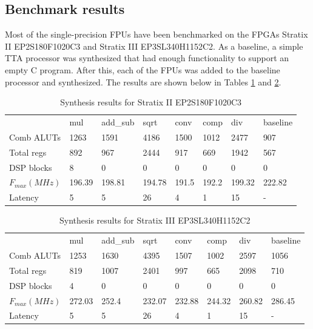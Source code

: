 \documentclass[a4paper,twoside]{tceusermanual}
\begin{document}
\subsection{Benchmark results}

Most of the single-precision FPUs have been benchmarked on the FPGAs Stratix II EP2S180F1020C3 and 
Stratix III EP3SL340H1152C2. As a baseline, a simple TTA processor 
was synthesized that had enough functionality to support an empty C program. 
After this, each of the FPUs was added to the baseline processor and synthesized. 
The results are shown below in Tables \ref{table:fpu_benchmark1}
and \ref{table:fpu_benchmark2}.

\begin{table}
\begin{center}
\begin{tabular}{|l|l|l|l|l|l|l|l|}\cline{1-8}
 & mul & add\_sub & sqrt & conv & comp & div & baseline \\\cline{1-8}
Comb ALUTs & 1263 & 1591 & 4186 & 1500 & 1012 & 2477 & 907 \\\cline{1-8}
Total regs & 892 & 967 & 2444 & 917 & 669 & 1942 & 567 \\\cline{1-8}
DSP blocks & 8 & 0 & 0 & 0 & 0 & 0 & 0 \\\cline{1-8}
$F_{max} (MHz)$ & 196.39 & 198.81 & 194.78 & 191.5 & 192.2 & 199.32 & 222.82 \\\cline{1-8}
Latency & 5 & 5 & 26 & 4 & 1 & 15 & - \\\cline{1-8}
\end{tabular}
\end{center}
\caption{Synthesis results for Stratix II EP2S180F1020C3}
\label{table:fpu_benchmark1}
\end{table}

\begin{table}
\begin{center}
\begin{tabular}{|l|l|l|l|l|l|l|l|}\cline{1-8}
 & mul & add\_sub & sqrt & conv & comp & div & baseline \\\cline{1-8}
Comb ALUTs & 1253 & 1630 & 4395 & 1507 & 1002 & 2597 & 1056 \\\cline{1-8}
Total regs & 819 & 1007 & 2401 & 997 & 665 & 2098 & 710 \\\cline{1-8}
DSP blocks & 4 & 0 & 0 & 0 & 0 & 0 & 0 \\\cline{1-8}
$F_{max} (MHz)$ & 272.03 & 252.4 & 232.07 & 232.88 & 244.32 & 260.82 & 286.45 \\\cline{1-8}
Latency & 5 & 5 & 26 & 4 & 1 & 15 & - \\\cline{1-8}
\end{tabular}
\end{center}
\caption{Synthesis results for Stratix III EP3SL340H1152C2}
\label{table:fpu_benchmark2}
\end{table}
\end{document}
